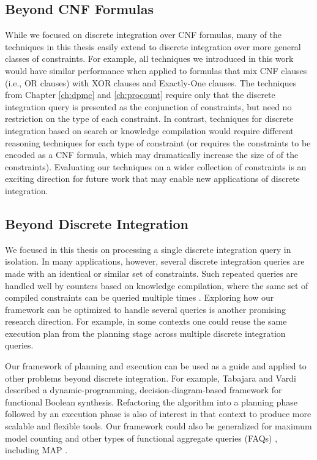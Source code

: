 \subsection{Beyond CNF Formulas}
While we focused on discrete integration over CNF formulas, many of the techniques in this thesis easily extend to discrete integration over more general classes of constraints.
For example, all techniques we introduced in this work would have similar performance when applied to formulas that mix CNF clauses (i.e., OR clauses) with XOR clauses and Exactly-One clauses. %
The techniques from Chapter \ref{ch:dpmc} and \ref{ch:procount} require only that the discrete integration query is presented as the conjunction of constraints, but need no restriction on the type of each constraint. 
In contrast, techniques for discrete integration based on search or knowledge compilation would require different reasoning techniques for each type of constraint (or requires the constraints to be encoded as a CNF formula, which may dramatically increase the size of of the constraints).
Evaluating our techniques on a wider collection of constraints is an exciting direction for future work that may enable new applications of discrete integration.


\subsection{Beyond Discrete Integration}
We focused in this thesis on processing a single discrete integration query in isolation. 
In many applications, however, several discrete integration queries are made with an identical or similar set of constraints.
Such repeated queries are handled well by counters based on knowledge compilation, where the same set of compiled constraints can be queried multiple times \cite{darwiche2002knowledge,koriche2013knowledge,LM17,darwiche2004new,OD15}.
Exploring how our framework can be optimized to handle several queries is another promising research direction.
For example, in some contexts one could reuse the same execution plan from the planning stage across multiple discrete integration queries.

Our framework of planning and execution can be used as a guide and applied to other problems beyond discrete integration.
For example, Tabajara and Vardi \cite{tabajara2017factored} described a dynamic-programming, decision-diagram-based framework for functional Boolean synthesis.
Refactoring the algorithm into a planning phase followed by an execution phase is also of interest in that context to produce more scalable and flexible tools.
Our framework could also be generalized for maximum model counting \cite{fremont2017maximum} and other types of functional aggregate queries (FAQs) \cite{KNR16}, including MAP \cite{murphy2012machine,maua2015complexity,xue2016solving}.
